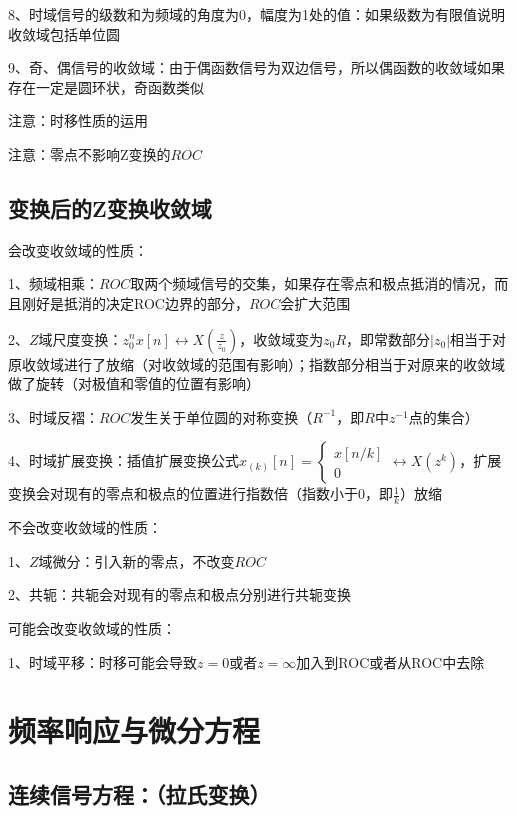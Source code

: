 8、时域信号的级数和为频域的角度为0，幅度为1处的值：如果级数为有限值说明收敛域包括单位圆

9、奇、偶信号的收敛域：由于偶函数信号为双边信号，所以偶函数的收敛域如果存在一定是圆环状，奇函数类似

注意：时移性质的运用

注意：零点不影响Z变换的$ROC$



\subsection{变换后的Z变换收敛域}

会改变收敛域的性质：

1、频域相乘：$ROC$取两个频域信号的交集，如果存在零点和极点抵消的情况，而且刚好是抵消的决定ROC边界的部分，$ROC$会扩大范围

2、$Z$域尺度变换：$z_0^{n} x[n] \leftrightarrow X\left(\frac{z}{z_0}\right)$，收敛域变为$z_0R$，即常数部分$|z_0|$相当于对原收敛域进行了放缩（对收敛域的范围有影响）；指数部分相当于对原来的收敛域做了旋转（对极值和零值的位置有影响）

3、时域反褶：$ROC$发生关于单位圆的对称变换（$R^{-1}$，即$R$中$z^{-1}$点的集合）

4、时域扩展变换：插值扩展变换公式$x_{(k)}[n]=\left\{\begin{array}{l}

x[n / k] \\

0

\end{array} \leftrightarrow X\left(z^{k}\right)\right.$，扩展变换会对现有的零点和极点的位置进行指数倍（指数小于0，即$\frac 1 k$）放缩

不会改变收敛域的性质：

1、$Z$域微分：引入新的零点，不改变$ROC$

2、共轭：共轭会对现有的零点和极点分别进行共轭变换

可能会改变收敛域的性质：

1、时域平移：时移可能会导致$z=0$或者$z=\infty$加入到ROC或者从ROC中去除

\section{频率响应与微分方程}



\subsection{连续信号方程：（拉氏变换）}


